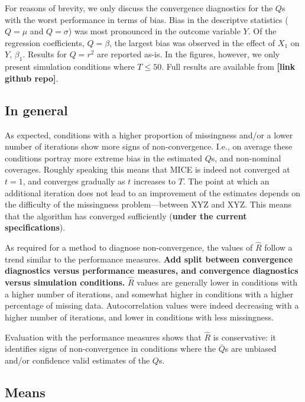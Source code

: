 \documentclass[Royal,times,sageh]{sagej}
\begin{document}
For reasons of brevity, we only discuss the convergence diagnostics for the \(Q\)s with the worst performance in terms of bias. Bias in the descriptve statistics (\(Q=\mu\) and \(Q=\sigma\)) was most pronounced in the outcome variable \(Y\). Of the regression coefficients, \(Q=\beta\), the largest bias was observed in the effect of \(X_1\) on \(Y\), \(\beta_1\). Results for \(Q=r^2\) are reported as-is. In the figures, however, we only present simulation conditions where \(T\leq50\). Full results are available from \textbf{{[}link github repo{]}}.

\hypertarget{in-general}{%
\subsection{In general}\label{in-general}}

As expected, conditions with a higher proportion of missingness and/or a lower number of iterations show more signs of non-convergence. I.e., on average these conditions portray more extreme bias in the estimated \(Q\)s, and non-nominal coverages. Roughly speaking this means that MICE is indeed not converged at \(t=1\), and converges gradually as \(t\) increases to \(T\). The point at which an additional iteration does not lead to an improvement of the estimates depends on the difficulty of the missingness problem---between XYZ and XYZ. This means that the algorithm has converged sufficiently (\textbf{under the current specifications}).

As required for a method to diagnose non-convergence, the values of \(\widehat{R}\) follow a trend similar to the performance measures. \textbf{Add split between convergence diagnostics versus performance measures, and convergence diagnostics versus simulation conditions.} \(\widehat{R}\) values are generally lower in conditions with a higher number of iterations, and somewhat higher in conditions with a higher percentage of missing data. Autocorrelation values were indeed decreasing with a higher number of iterations, and lower in conditions with less missingness.

Evaluation with the performance measures shows that \(\widehat{R}\) is conservative: it identifies signs of non-convergence in conditions where the \(\bar{Q}\)s are unbiased and/or confidence valid estimates of the \(Q\)s.

\hypertarget{means}{%
\subsection{Means}\label{means}}
\end{document}
